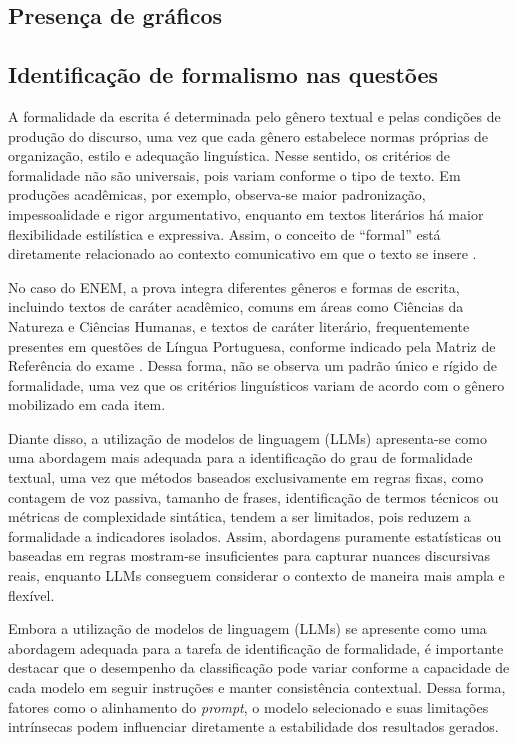 \documentclass[a4paper,10pt, twocolumn]{article}
\begin{document}
\subsection{Presença de gráficos}

\subsection{Identificação de formalismo nas questões}
\label{sec:identificacao-formalismo-questoes}

A formalidade da escrita é determinada pelo gênero textual e pelas condições de produção do discurso, uma vez que cada gênero estabelece normas próprias de organização, estilo e adequação linguística. Nesse sentido, os critérios de formalidade não são universais, pois variam conforme o tipo de texto. Em produções acadêmicas, por exemplo, observa-se maior padronização, impessoalidade e rigor argumentativo, enquanto em textos literários há maior flexibilidade estilística e expressiva. Assim, o conceito de “formal” está diretamente relacionado ao contexto comunicativo em que o texto se insere \cite{Ciapuscio2005}.

No caso do ENEM, a prova integra diferentes gêneros e formas de escrita, incluindo textos de caráter acadêmico, comuns em áreas como Ciências da Natureza e Ciências Humanas, e textos de caráter literário, frequentemente presentes em questões de Língua Portuguesa, conforme indicado pela Matriz de Referência do exame \cite{INEP_ENEM_Matriz}. Dessa forma, não se observa um padrão único e rígido de formalidade, uma vez que os critérios linguísticos variam de acordo com o gênero mobilizado em cada item.

Diante disso, a utilização de modelos de linguagem (LLMs) apresenta-se como uma abordagem mais adequada para a identificação do grau de formalidade textual, uma vez que métodos baseados exclusivamente em regras fixas, como contagem de voz passiva, tamanho de frases, identificação de termos técnicos ou métricas de complexidade sintática, tendem a ser limitados, pois reduzem a formalidade a indicadores isolados. Assim, abordagens puramente estatísticas ou baseadas em regras mostram-se insuficientes para capturar nuances discursivas reais, enquanto LLMs conseguem considerar o contexto de maneira mais ampla e flexível.

Embora a utilização de modelos de linguagem (LLMs) se apresente como uma abordagem adequada para a tarefa de identificação de formalidade, é importante destacar que o desempenho da classificação pode variar conforme a capacidade de cada modelo em seguir instruções e manter consistência contextual. Dessa forma, fatores como o alinhamento do \textit{prompt}, o modelo selecionado e suas limitações intrínsecas podem influenciar diretamente a estabilidade dos resultados gerados.
\end{document}
